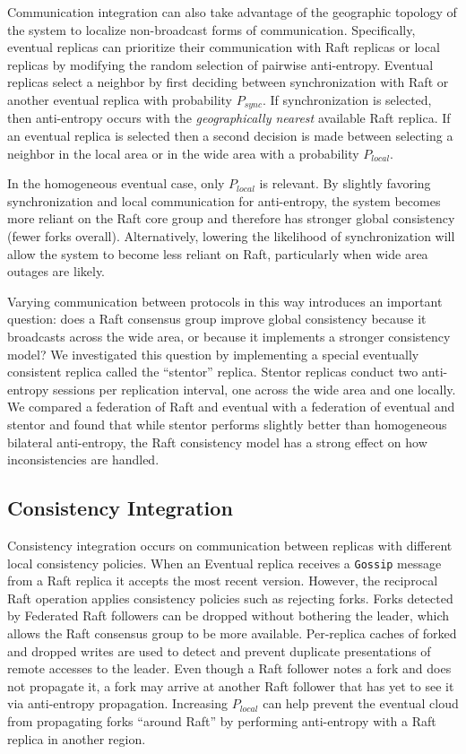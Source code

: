\documentclass[10pt,conference,letterpaper]{IEEEtran}
\begin{document}
Communication integration can also take advantage of the geographic topology of the
system to localize non-broadcast forms of communication.
Specifically, eventual replicas can prioritize their communication with Raft replicas or
local replicas by modifying the random selection of pairwise anti-entropy.
Eventual replicas select a neighbor by first deciding between synchronization with Raft
or another eventual replica with probability $P_{sync}$.
If synchronization is selected, then anti-entropy occurs with the \textit{geographically
nearest} available Raft replica.
If an eventual replica is selected then a second decision is made between selecting a
neighbor in the local area or in the wide area with a probability $P_{local}$.

In the homogeneous eventual case, only $P_{local}$ is relevant.
By slightly favoring synchronization and local communication for anti-entropy, the
system becomes more reliant on the Raft core group and therefore has stronger global
consistency (fewer forks overall).
Alternatively, lowering the likelihood of synchronization will allow the system to become
less reliant on Raft, particularly when wide area outages are likely.

Varying communication between protocols in this way introduces an important
question: does a Raft consensus group improve global consistency because
it broadcasts across the wide area, or because it implements a stronger
consistency model?
We investigated this question by implementing
a special eventually consistent replica called the ``stentor'' replica.
Stentor replicas conduct two anti-entropy sessions per replication interval,
one across the wide area and one locally.
We compared a federation of Raft and eventual with a federation of eventual
and stentor and found that while stentor performs slightly better than
homogeneous bilateral anti-entropy, the Raft consistency model has a strong
effect on how inconsistencies are handled.

\subsection{Consistency Integration}

Consistency integration occurs on communication between replicas with
different local consistency policies.
When an Eventual replica receives a \texttt{Gossip} message from a Raft
replica it accepts the most recent version.
However, the reciprocal Raft operation applies consistency policies such as
rejecting forks.
Forks detected by Federated Raft followers can be dropped without
bothering the leader, which allows the Raft consensus group to be more
available.
Per-replica caches of forked and dropped writes are used to detect and prevent
duplicate presentations of remote accesses to the leader.
Even though a Raft follower notes a fork and does not propagate it, a fork may
arrive at another Raft follower that has yet to see it via anti-entropy
propagation.
Increasing $P_{local}$ can help prevent the eventual cloud from propagating
forks ``around Raft'' by performing anti-entropy with a Raft replica in
another region.
\end{document}
